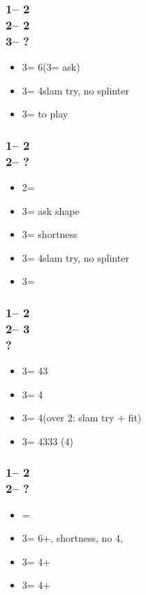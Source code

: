 \documentclass[12pt, a4paper]{article}
\begin{document}
\subsubsection*{1\nt -- 2\clubs\\
                2\hearts -- 2\spades\\
                3\clubs -- ?}
\begin{itemize}
    \item 3\diams = 6\spades (3\hearts = ask)
    \item 3\hearts = 4\hearts slam try, no splinter
    \item 3\nt = to play
\end{itemize}

\subsubsection*{1\nt -- 2\clubs\\
                2\spades -- ?}
\begin{itemize}
    \item 2\nt = \inv
    \item 3\clubs = ask shape
    \item 3\diams = \minor shortness
    \item 3\hearts = 4\hearts slam try, no splinter
    \item 3\spades = \inv
\end{itemize}

\subsubsection*{1\nt -- 2\clubs\\
                2\major -- 3\clubs\\
                ?}
\begin{itemize}
    \item 3\diams = 43\minor
    \item 3\hearts = 4\clubs
    \item 3\spades = 4\diams (over 2\spades: slam try + fit)
    \item 3\nt = 4333 (4\major)
\end{itemize}

\subsubsection*{1\nt -- 2\clubs\\
                2\nt -- ?}
\begin{itemize}
    \item \pass = \inv\ \bal
    \item 3\clubs = 6+\diams, \clubs shortness, no 4\major, \gf
    \item 3\diams = 4+\hearts
    \item 3\hearts = 4+\spades
\end{itemize}
\end{document}
